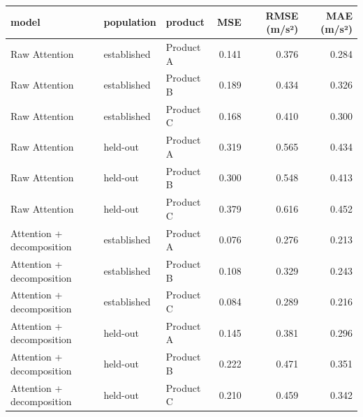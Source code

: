 \begin{tabular}{lllrrr}
\toprule
model & population & product & MSE & RMSE (m/s²) & MAE (m/s²) \\
\midrule
Raw Attention & established & Product A & 0.141 & 0.376 & 0.284 \\
Raw Attention & established & Product B & 0.189 & 0.434 & 0.326 \\
Raw Attention & established & Product C & 0.168 & 0.410 & 0.300 \\
Raw Attention & held-out & Product A & 0.319 & 0.565 & 0.434 \\
Raw Attention & held-out & Product B & 0.300 & 0.548 & 0.413 \\
Raw Attention & held-out & Product C & 0.379 & 0.616 & 0.452 \\
Attention + decomposition & established & Product A & 0.076 & 0.276 & 0.213 \\
Attention + decomposition & established & Product B & 0.108 & 0.329 & 0.243 \\
Attention + decomposition & established & Product C & 0.084 & 0.289 & 0.216 \\
Attention + decomposition & held-out & Product A & 0.145 & 0.381 & 0.296 \\
Attention + decomposition & held-out & Product B & 0.222 & 0.471 & 0.351 \\
Attention + decomposition & held-out & Product C & 0.210 & 0.459 & 0.342 \\
\bottomrule
\end{tabular}
